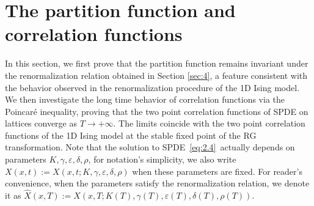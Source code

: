 \documentclass[11pt]{article}
\numberwithin{equation}{section}%
\numberwithin{figure}{section}%
\theoremstyle{remark}
\begin{document}
\section{The partition function and correlation functions}\label{sec:5}
In this section, we first prove that the partition function remains invariant under the renormalization relation obtained in Section \ref{sec:4}, a feature consistent with the behavior observed in the renormalization procedure of the 1D Ising model. We then investigate the long time behavior of correlation functions via the Poincaré inequality, proving that the two point
correlation functions of SPDE on lattices converge as $T\rightarrow +\infty$. The limits coincide with the two point correlation functions of the 1D Ising model at the stable fixed point of the RG transformation. Note that the solution to SPDE~\eqref{eq:2.4}~actually depends on parameters $K,\gamma,\varepsilon,\delta,\rho$, for notation's simplicity, we also write $X(x,t):=X(x,t;K,\gamma,\varepsilon,\delta,\rho)$ when these parameters are fixed. For reader’s convenience, when the parameters satisfy the renormalization relation, we denote it as $\hat{X}(x,T):=X(x,T;K(T),\gamma(T),\varepsilon(T),\delta(T),\rho(T))$.
\end{document}
